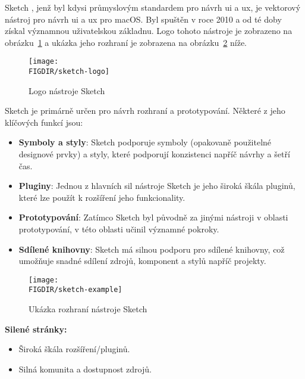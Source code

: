 \begin{subsection}{Sketch}
    \label{subsec:navrh-ui-nastroje-sketch}
    , jenž byl kdysi průmyslovým standardem pro návrh \ac{ui} a \ac{ux}, je vektorový nástroj pro návrh \ac{ui} a \ac{ux} pro macOS\@.
    Byl spuštěn v roce 2010 a od té doby získal významnou uživatelskou základnu\cite{w_industry_the_ultimate_battle_figma_vs_sketch_vs_adobe_xd}.
    Logo tohoto nástroje je zobrazeno na obrázku~\ref{fig:sketch-logo} a ukázka jeho rozhraní je zobrazena na obrázku~\ref{fig:sketch-example} níže.

    \begin{figure}[H]
        \centering
        \texttt{[image: \\FIGDIR/sketch-logo]}
        \caption{Logo nástroje Sketch\cite{sketch}}
        \label{fig:sketch-logo}
    \end{figure}

    Sketch je primárně určen pro návrh rozhraní a prototypování.
    Některé z jeho klíčových funkcí jsou:

    \begin{itemize}
        \item \textbf{Symboly a styly}: Sketch podporuje symboly (opakovaně použitelné designové prvky) a styly, které podporují konzistenci napříč návrhy a šetří čas.
        \item \textbf{Pluginy}: Jednou z hlavních sil nástroje Sketch je jeho široká škála pluginů, které lze použít k rozšíření jeho funkcionality.
        \item \textbf{Prototypování}: Zatímco Sketch byl původně za jinými nástroji v oblasti prototypování, v této oblasti učinil významné pokroky.
        \item \textbf{Sdílené knihovny}: Sketch má silnou podporu pro sdílené knihovny, což umožňuje snadné sdílení zdrojů, komponent a stylů napříč projekty.
    \end{itemize}

    \begin{figure}[H]
        \centering
        \texttt{[image: \\FIGDIR/sketch-example]}
        \caption{Ukázka rozhraní nástroje Sketch\cite{sketch}}
        \label{fig:sketch-example}
    \end{figure}

    \textbf{Silené stránky:}
    \begin{itemize}
        \item Široká škála rozšíření/pluginů.
        \item Silná komunita a dostupnost zdrojů.
    \end{itemize}


\end{subsection}
